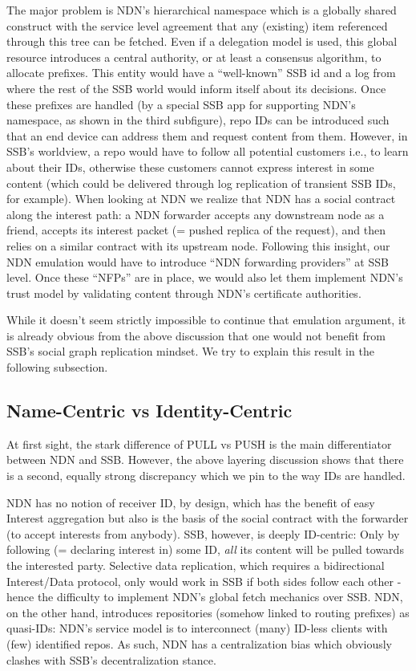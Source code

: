 \documentclass[10pt,sigconf,rewiew]{acmart}
\begin{document}
The major problem is NDN's hierarchical namespace which is a globally
shared construct with the service level agreement that any (existing)
item referenced through this tree can be fetched.  Even if a
delegation model is used, this global resource introduces a central
authority, or at least a consensus algorithm, to allocate
prefixes. This entity would have a ``well-known'' SSB id and a log
from where the rest of the SSB world would inform itself about its
decisions. Once these prefixes are handled (by a special SSB app for
supporting NDN's namespace, as shown in the third subfigure), repo IDs
can be introduced such that an end device can address them and request
content from them. However, in SSB's worldview, a repo would have to
follow all potential customers i.e., to learn about their IDs,
otherwise these customers cannot express interest in some content
(which could be delivered through log replication of transient SSB
IDs, for example). When looking at NDN we realize that NDN has a
social contract along the interest path: a NDN forwarder accepts any
downstream node as a friend, accepts its interest packet (= pushed
replica of the request), and then relies on a similar contract with
its upstream node. Following this insight, our NDN emulation would
have to introduce ``NDN forwarding providers'' at SSB level. Once
these ``NFPs'' are in place, we would also let them implement
NDN's trust model by validating content through NDN's certificate
authorities.

While it doesn't seem strictly impossible to continue that emulation
argument, it is already obvious from the above discussion that one
would not benefit from SSB's social graph replication mindset. We try
to explain this result in the following subsection.


\subsection{Name-Centric vs Identity-Centric}

At first sight, the stark difference of PULL vs PUSH is the main
differentiator between NDN and SSB. However, the above layering
discussion shows that there is a second, equally strong discrepancy
which we pin to the way IDs are handled.

NDN has no notion of receiver ID, by design, which has the benefit of
easy Interest aggregation but also is the basis of the social contract
with the forwarder (to accept interests from anybody). SSB, however,
is deeply ID-centric: Only by following (= declaring interest in) some
ID, {\em all} its content will be pulled towards the interested
party. Selective data replication, which requires a bidirectional
Interest/Data protocol, only would work in SSB if both sides follow
each other - hence the difficulty to implement NDN's global fetch
mechanics over SSB. NDN, on the other hand, introduces repositories
(somehow linked to routing prefixes) as quasi-IDs: NDN's service model
is to interconnect (many) ID-less clients with (few) identified repos.
As such, NDN has a centralization bias which obviously clashes with
SSB's decentralization stance.
\end{document}
